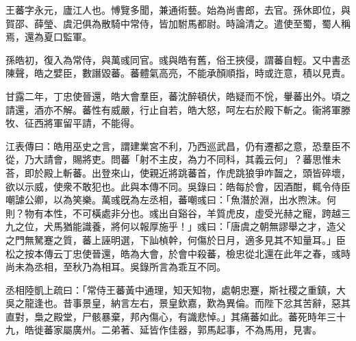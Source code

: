 
\begin{pinyinscope}
王蕃字永元，廬江人也。愽覽多聞，兼通術藝。始為尚書郎，去官。孫休即位，與賀邵、薛瑩、虞汜俱為散騎中常侍，皆加駙馬都尉。時論清之。遣使至蜀，蜀人稱焉，還為夏口監軍。

孫皓初，復入為常侍，與萬彧同官。彧與皓有舊，俗王挾侵，謂蕃自輕。又中書丞陳聲，皓之嬖臣，數譖毀蕃。蕃體氣高亮，不能承顏順指，時或迕意，積以見責。

甘露二年，丁忠使晉還，皓大會羣臣，蕃沈醉頓伏，皓疑而不恱，轝蕃出外。頃之請還，酒亦不解。蕃性有威嚴，行止自若，皓大怒，呵左右於殿下斬之。衞將軍滕牧、征西將軍留平請，不能得。

江表傳曰：皓用巫史之言，謂建業宮不利，乃西巡武昌，仍有遷都之意，恐羣臣不從，乃大請會，賜將吏。問蕃「射不主皮，為力不同科，其義云何」？蕃思惟未荅，即於殿上斬蕃。出登來山，使親近將跳蕃首，作虎跳狼爭咋齧之，頭皆碎壞，欲以示威，使衆不敢犯也。此與本傳不同。吳錄曰：皓每於會，因酒酣，輒令侍臣嘲謔公卿，以為笑樂。萬彧旣為左丞相，蕃嘲彧曰：「魚潛於淵，出水煦沫。何則？物有本性，不可橫處非分也。彧出自谿谷，羊質虎皮，虛受光赫之寵，跨越三九之位，犬馬猶能識養，將何以報厚施乎！」彧曰：「唐虞之朝無謬舉之才，造父之門無駑蹇之質，蕃上誣明選，下訕楨幹，何傷於日月，適多見其不知量耳。」臣松之按本傳云丁忠使晉還，皓為大會，於會中殺蕃，檢忠從北還在此年之春，彧時尚未為丞相，至秋乃為相耳。吳錄所言為乖互不同。

丞相陸凱上疏曰：「常侍王蕃黃中通理，知天知物，處朝忠蹇，斯社稷之重鎮，大吳之龍逢也。昔事景皇，納言左右，景皇欽嘉，歎為異倫。而陛下忿其苦辭，惡其直對，梟之殿堂，尸骸暴棄，邦內傷心，有識悲悼。」其痛蕃如此。蕃死時年三十九，皓徙蕃家屬廣州。二弟著、延皆作佳器，郭馬起事，不為馬用，見害。


\end{pinyinscope}